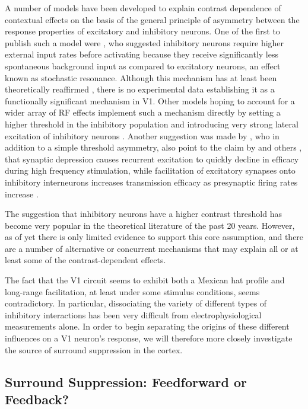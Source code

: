 A number of models have been developed to explain contrast dependence
of contextual effects on the basis of the general principle of
asymmetry between the response properties of excitatory and inhibitory
neurons. One of the first to publish such a model were
\cite{Stemmler1995}, who suggested inhibitory neurons require higher
external input rates before activating because they receive
significantly less spontaneous background input as compared to
excitatory neurons, an effect known as stochastic resonance. Although
this mechanism has at least been theoretically reaffirmed
\citep{Bezrukov1997}, there is no experimental data establishing it as
a functionally significant mechanism in V1. Other models hoping to
account for a wider array of RF effects implement such a mechanism
directly by setting a higher threshold in the inhibitory population
and introducing very strong lateral excitation of inhibitory neurons
\citep{Schwabe2006}. Another suggestion was made by \cite{Somers1998},
who in addition to a simple threshold asymmetry, also point to the
claim by \cite{Thomson1994} and others \citep{Abbott1997,Tsodyks1997},
that synaptic depression causes recurrent excitation to quickly
decline in efficacy during high frequency stimulation, while
facilitation of excitatory synapses onto inhibitory interneurons
increases transmission efficacy as presynaptic firing rates increase
\citep{Thomson1995}.

The suggestion that inhibitory neurons have a higher contrast
threshold has become very popular in the theoretical literature of the
past 20 years. However, as of yet there is only limited evidence to
support this core assumption, and there are a number of alternative or
concurrent mechanisms that may explain all or at least some of the
contrast-dependent effects.

The fact that the V1 circuit seems to exhibit both a Mexican hat
profile and long-range facilitation, at least under some stimulus
conditions, seems contradictory. In particular, dissociating the
variety of different types of inhibitory interactions has been very
difficult from electrophysiological measurements alone. In order to
begin separating the origins of these different influences on a V1
neuron's response, we will therefore more closely investigate the
source of surround suppression in the cortex.

\subsection{Surround Suppression: Feedforward or Feedback?}

